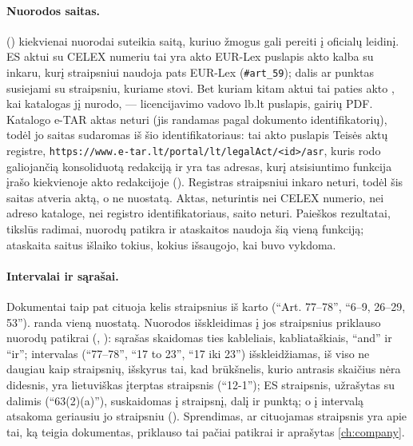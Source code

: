 \paragraph{Nuorodos saitas.}  () kiekvienai
nuorodai suteikia saitą, kuriuo žmogus gali pereiti į oficialų leidinį. ES aktui su CELEX
numeriu tai yra akto EUR-Lex puslapis akto kalba su inkaru, kurį straipsniui naudoja pats
EUR-Lex (\texttt{\#art\_59}); dalis ar punktas susiejami su straipsniu, kuriame stovi. Bet kuriam
kitam aktui tai paties akto , kai katalogas jį nurodo, --- licencijavimo vadovo
lb.lt puslapis, gairių
PDF. Katalogo e-TAR aktas  neturi (jis randamas pagal dokumento
identifikatorių), todėl jo saitas sudaromas iš šio identifikatoriaus: tai akto puslapis Teisės
aktų registre, \texttt{https://www.e-tar.lt/portal/lt/legalAct/<id>/asr}, kuris rodo galiojančią
konsoliduotą redakciją ir yra tas adresas, kurį atsisiuntimo funkcija įrašo
kiekvienoje akto redakcijoje (). Registras straipsniui
inkaro neturi, todėl šis saitas atveria aktą, o ne nuostatą. Aktas, neturintis nei CELEX
numerio, nei adreso kataloge, nei registro identifikatoriaus, saito neturi. Paieškos rezultatai,
tikslūs radimai, nuorodų patikra ir ataskaitos naudoja šią vieną funkciją; ataskaita saitus
išlaiko tokius, kokius išsaugojo, kai buvo vykdoma.

\paragraph{Intervalai ir sąrašai.} Dokumentai taip pat cituoja kelis straipsnius iš karto
(\enquote{Art. 77–78}, \enquote{6–9, 26–29, 53}).  randa vieną nuostatą.
Nuorodos išskleidimas į jos straipsnius priklauso nuorodų patikrai (,
): sąrašas skaidomas ties kableliais, kabliataškiais, \enquote{and} ir
\enquote{ir}; intervalas (\enquote{77–78}, \enquote{17 to 23}, \enquote{17 iki 23})
išskleidžiamas, iš viso ne daugiau kaip  straipsnių, išskyrus tai,
kad brūkšnelis, kurio antrasis skaičius nėra didesnis, yra lietuviškas įterptas straipsnis
(\enquote{12-1}); ES straipsnis, užrašytas su dalimis (\enquote{63(2)(a)}), suskaidomas į
straipsnį, dalį ir punktą; o į intervalą atsakoma geriausiu jo straipsniu ().
Sprendimas, ar cituojamas straipsnis yra apie tai, ką teigia dokumentas, priklauso tai pačiai
patikrai ir aprašytas \cref{ch:company}.



